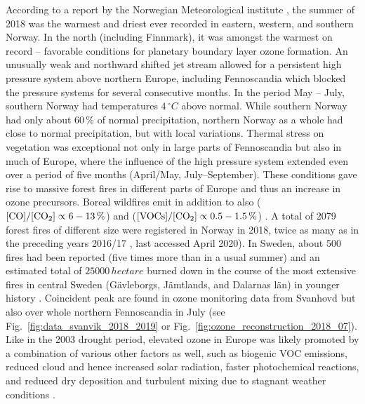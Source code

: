 \documentclass[bg, manuscript]{copernicus}
\begin{document}
According to a report by the Norwegian Meteorological institute \citep{MetNOR2019}, the summer of 2018 was the warmest and driest ever recorded in eastern, western, and southern Norway. In the north (including Finnmark), it was amongst the warmest on record -- favorable conditions for planetary boundary layer ozone formation.
An unusually weak and northward shifted jet stream allowed for a persistent high pressure system above northern Europe, including Fennoscandia which blocked the pressure systems for several consecutive months. In the period May -- July, southern Norway had temperatures $4\,\unit{^\circ C}$ above normal. While southern Norway had only about $60\,\unit{\%}$ of normal precipitation, northern Norway as a whole had close to normal precipitation, but with local variations.
Thermal stress on vegetation was exceptional not only in large parts of Fennoscandia but also in much of Europe, where the influence of the high pressure system extended even over a period of five months (April/May, July--September). These conditions gave rise to massive forest fires in different parts of Europe and thus an increase in ozone precursors. Boreal wildfires emit in addition to  also  ($\chem{[CO]}/\chem{[CO_2]} \propto 6-13\,\unit{\%}$) and  ($\chem{[VOCs]}/\chem{[CO_2]} \propto 0.5-1.5\,\unit{\%}$) \citep{AE:Cofer1990}.
A total of 2079 forest fires of different size were registered in Norway in 2018, twice as many as in the preceding years 2016/17 \citep{DSB2019}, last accessed April 2020). In Sweden, about 500 fires had been reported (five times more than in a usual summer) and an estimated total of $25000\,\unit{hectare}$ burned down in the course of the most extensive fires in central Sweden (G\"{a}vleborgs, J\"{a}mtlands, and Dalarnas l\"{a}n) in younger history \citep{SOU2019}. Coincident peak \chem{[O_3]} are found in ozone monitoring data from Svanhovd but also over whole northern Fennoscandia in July (see Fig.~\ref{fig:data_svanvik_2018_2019} or Fig.~\ref{fig:ozone_reconstruction_2018_07}).
Like in the 2003 drought period, elevated ozone in Europe was likely promoted by a combination of various other factors as well, such as biogenic VOC emissions, reduced cloud and hence increased solar radiation, faster photochemical reactions, and reduced dry deposition and turbulent mixing due to stagnant weather conditions \citep{JGR:Solberg2018}.\\
\end{document}
